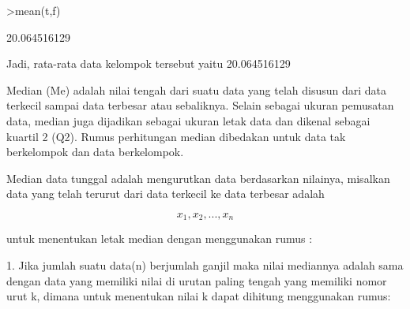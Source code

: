 \documentclass[a4paper,10pt]{article}
\begin{document}
\begin{eulernotebook}
\begin{eulercomment}
\begin{eulercomment}
\begin{eulercomment}
\begin{eulercomment}
\begin{eulercomment}
\begin{eulercomment}
\begin{eulercomment}
\begin{eulercomment}
\begin{eulercomment}
\begin{eulercomment}
\begin{eulercomment}
\begin{eulercomment}
\begin{eulerprompt}
\end{eulerprompt}
\begin{euleroutput}
  [12,  17,  22,  27]
\end{euleroutput}
\begin{eulerprompt}
>mean(t,f)
\end{eulerprompt}
\begin{euleroutput}
  20.064516129
\end{euleroutput}
\begin{eulercomment}
Jadi, rata-rata data kelompok tersebut yaitu 20.064516129\\
\end{eulercomment}
\begin{eulercomment}
Median (Me) adalah nilai tengah dari suatu data yang telah disusun
dari data terkecil sampai data terbesar atau sebaliknya. Selain
sebagai ukuran pemusatan data, median juga dijadikan sebagai ukuran
letak data dan dikenal sebagai kuartil 2 (Q2). Rumus perhitungan
median dibedakan untuk data tak berkelompok dan data berkelompok.

\end{eulercomment}
\begin{eulercomment}
Median data tunggal adalah mengurutkan data berdasarkan nilainya,
misalkan data yang telah terurut dari data terkecil ke data terbesar
adalah\\
\end{eulercomment}
\begin{eulerformula}
\[
x_1, x_2,..., x_n
\]
\end{eulerformula}
\begin{eulerttcomment}
 untuk menentukan letak median dengan menggunakan rumus :
\end{eulerttcomment}
\begin{eulercomment}
1. Jika jumlah suatu data(n) berjumlah ganjil maka nilai mediannya
adalah sama dengan data yang memiliki nilai di urutan paling tengah
yang memiliki nomor urut k, dimana untuk menentukan nilai k dapat
dihitung menggunakan rumus:


\end{eulercomment}
\end{eulercomment}
\end{eulercomment}
\end{eulercomment}
\end{eulercomment}
\end{eulercomment}
\end{eulercomment}
\end{eulercomment}
\end{eulercomment}
\end{eulercomment}
\end{eulercomment}
\end{eulercomment}
\end{eulercomment}
\end{eulernotebook}
\end{document}
